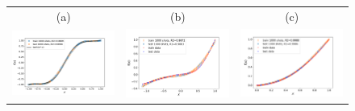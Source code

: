 \documentclass[12pt, a4paper,  nobibnotes]{article}
\begin{document}
\begin{figure}[H]
\begin{tabular}{ccc}
      (a) & (b) & (c) \\[6.5pt]
      \includegraphics[width=\thisfigurewidth\textwidth]{figures/tanh-results-bs=16-lr=0_001-s1000.pdf} & 
      \includegraphics[width=\thisfigurewidth\textwidth]{figures/iv-bs=4-lr=0_001-s1000.pdf} &
      \includegraphics[width=\thisfigurewidth\textwidth]{figures/x2-bs=4-lr=0_001-s1000.pdf} \\

\end{tabular}
\end{figure}
\end{document}
